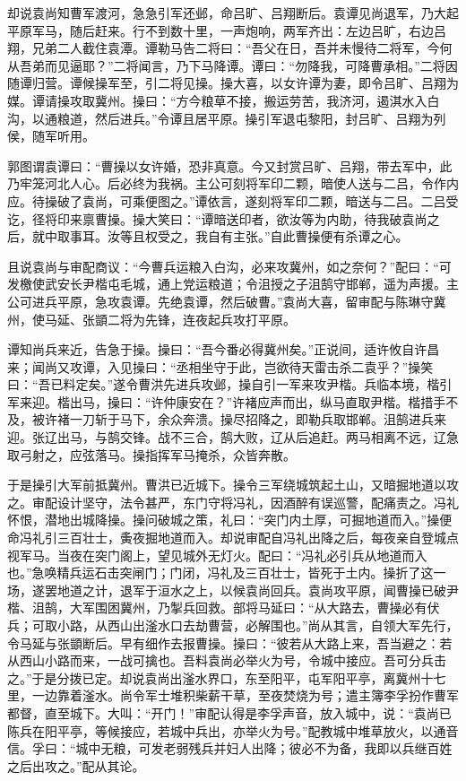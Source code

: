 却说袁尚知曹军渡河，急急引军还邺，命吕旷、吕翔断后。袁谭见尚退军，乃大起平原军马，随后赶来。行不到数十里，一声炮响，两军齐出：左边吕旷，右边吕翔，兄弟二人截住袁潭。谭勒马告二将曰：“吾父在日，吾并未慢待二将军，今何从吾弟而见逼耶？”二将闻言，乃下马降谭。谭曰：“勿降我，可降曹承相。”二将因随谭归营。谭候操军至，引二将见操。操大喜，以女许谭为妻，即令吕旷、吕翔为媒。谭请操攻取冀州。操曰：“方今粮草不接，搬运劳苦，我济河，遏淇水入白沟，以通粮道，然后进兵。”令谭且居平原。操引军退屯黎阳，封吕旷、吕翔为列侯，随军听用。

郭图谓袁谭曰：“曹操以女许婚，恐非真意。今又封赏吕旷、吕翔，带去军中，此乃牢笼河北人心。后必终为我祸。主公可刻将军印二颗，暗使人送与二吕，令作内应。待操破了袁尚，可乘便图之。”谭依言，遂刻将军印二颗，暗送与二吕。二吕受讫，径将印来禀曹操。操大笑曰：“谭暗送印者，欲汝等为内助，待我破袁尚之后，就中取事耳。汝等且权受之，我自有主张。”自此曹操便有杀谭之心。

且说袁尚与审配商议：“今曹兵运粮入白沟，必来攻冀州，如之奈何？”配曰：“可发檄使武安长尹楷屯毛城，通上党运粮道；令沮授之子沮鹄守邯郸，遥为声援。主公可进兵平原，急攻袁谭。先绝袁谭，然后破曹。”袁尚大喜，留审配与陈琳守冀州，使马延、张顗二将为先锋，连夜起兵攻打平原。

谭知尚兵来近，告急于操。操曰：“吾今番必得冀州矣。”正说间，适许攸自许昌来；闻尚又攻谭，入见操曰：“丞相坐守于此，岂欲待天雷击杀二袁乎？”操笑曰：“吾已料定矣。”遂令曹洪先进兵攻邺，操自引一军来攻尹楷。兵临本境，楷引军来迎。楷出马，操曰：“许仲康安在？”许褚应声而出，纵马直取尹楷。楷措手不及，被许褚一刀斩于马下，余众奔溃。操尽招降之，即勒兵取邯郸。沮鹄进兵来迎。张辽出马，与鹄交锋。战不三合，鹄大败，辽从后追赶。两马相离不远，辽急取弓射之，应弦落马。操指挥军马掩杀，众皆奔散。

于是操引大军前抵冀州。曹洪已近城下。操令三军绕城筑起土山，又暗掘地道以攻之。审配设计坚守，法令甚严，东门守将冯礼，因酒醉有误巡警，配痛责之。冯礼怀恨，潜地出城降操。操问破城之策，礼曰：“突门内土厚，可掘地道而入。”操便命冯礼引三百壮士，夤夜掘地道而入。却说审配自冯礼出降之后，每夜亲自登城点视军马。当夜在突门阁上，望见城外无灯火。配曰：“冯礼必引兵从地道而入也。”急唤精兵运石击突闸门；门闭，冯礼及三百壮士，皆死于土内。操折了这一场，遂罢地道之计，退军于洹水之上，以候袁尚回兵。袁尚攻平原，闻曹操已破尹楷、沮鹄，大军围困冀州，乃掣兵回救。部将马延曰：“从大路去，曹操必有伏兵；可取小路，从西山出滏水口去劫曹营，必解围也。”尚从其言，自领大军先行，令马延与张顗断后。早有细作去报曹操。操曰：“彼若从大路上来，吾当避之：若从西山小路而来，一战可擒也。吾料袁尚必举火为号，令城中接应。吾可分兵击之。”于是分拨已定。却说袁尚出滏水界口，东至阳平，屯军阳平亭，离冀州十七里，一边靠着滏水。尚令军士堆积柴薪干草，至夜焚烧为号；遣主簿李孚扮作曹军都督，直至城下。大叫：“开门！”审配认得是李孚声音，放入城中，说：“袁尚已陈兵在阳平亭，等候接应，若城中兵出，亦举火为号。”配教城中堆草放火，以通音信。孚曰：“城中无粮，可发老弱残兵并妇人出降；彼必不为备，我即以兵继百姓之后出攻之。”配从其论。

